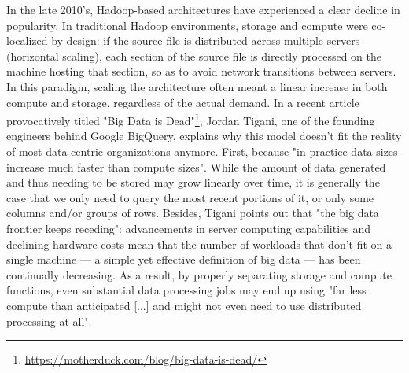 In the late 2010's, Hadoop-based architectures have experienced a clear decline in popularity. In traditional Hadoop environments, storage and compute were co-localized by design: if the source file is distributed across multiple servers (horizontal scaling), each section of the source file is directly processed on the machine hosting that section, so as to avoid network transitions between servers. In this paradigm, scaling the architecture often meant a linear increase in both compute and storage, regardless of the actual demand. In a recent article provocatively titled "Big Data is Dead"\footnote{\url{https://motherduck.com/blog/big-data-is-dead/}}, Jordan Tigani, one of the founding engineers behind Google BigQuery, explains why this model doesn't fit the reality of most data-centric organizations anymore. First, because "in practice data sizes increase much faster than compute sizes". While the amount of data generated and thus needing to be stored may grow linearly over time, it is generally the case that we only need to query the most recent portions of it, or only some columns and/or groups of rows. Besides, Tigani points out that "the big data frontier keeps receding": advancements in server computing capabilities and declining hardware costs mean that the number of workloads that don't fit on a single machine — a simple yet effective definition of big data — has been continually decreasing. As a result, by properly separating storage and compute functions, even substantial data processing jobs may end up using "far less compute than anticipated [...] and might not even need to use distributed processing at all".

